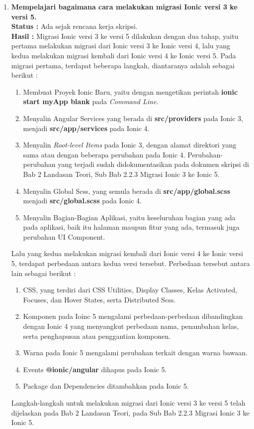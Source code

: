 \documentclass[a4paper,twoside]{article}
\begin{document}
\begin{enumerate}
		\item \textbf{Mempelajari bagaimana cara melakukan migrasi Ionic versi 3 ke versi 5.}\\
		{\bf Status :} Ada sejak rencana kerja skripsi.\\
		{\bf Hasil :} Migrasi Ionic versi 3 ke versi 5 dilakukan dengan dua tahap, yaitu pertama melakukan migrasi dari Ionic versi 3 ke Ionic versi 4, lalu yang kedua melakukan migrasi kembali dari Ionic versi 4 ke Ionic versi 5. Pada migrasi pertama, terdapat beberapa langkah, diantaranya adalah sebagai berikut :
		\begin{enumerate}
			\item Membuat Proyek Ionic Baru, yaitu dengan mengetikan perintah \textbf{ionic start myApp blank} pada \textit{Command Line}.
			\item Menyalin Angular Services yang berada di \textbf{src/providers} pada Ionic 3, menjadi \textbf{src/app/services} pada Ionic 4.
			\item Menyalin \textit{Root-level Items} pada Ionic 3, dengan alamat direktori yang sama atau dengan beberapa perubahan pada Ionic 4. Perubahan-perubahan yang terjadi sudah didokumentasikan pada dokumen skripsi di Bab 2 Landasan Teori, Sub Bab 2.2.3 Migrasi Ionic 3 ke Ionic 5.
			\item Menyalin Global Scss, yang semula berada di \textbf{src/app/global.scss} menjadi \textbf{src/global.scss} pada Ionic 4.
			\item Menyalin Bagian-Bagian Aplikasi, yaitu keseluruhan bagian yang ada pada aplikasi, baik itu halaman maupun fitur yang ada, termasuk juga perubahan UI Component.
		\end{enumerate}
		 
		Lalu yang kedua melakukan migrasi kembali dari Ionic versi 4 ke Ionic versi 5, terdapat perbedaan antara kedua versi tersebut. Perbedaan tersebut antara lain sebagai berikut :
		\begin{enumerate}
			\item CSS, yang terdiri dari CSS Utilities, Display Classes, Kelas Activated, Focuses, dan Hover States, serta Distributed Scss.
			\item Komponen pada Ioinc 5 mengalami perbedaan-perbedaan dibandingkan dengan Ionic 4 yang menyangkut perbedaan nama, penambahan kelas, serta penghapusan atau penggantian komponen.
			\item Warna pada Ionic 5 mengalami perubahan terkait dengan warna bawaan.
			\item Events \textbf{@ionic/angular} dihapus pada Ionic 5.
			\item Package dan Dependencies ditambahkan pada Ionic 5.
		\end{enumerate}				
		Langkah-langkah untuk melakukan migrasi dari Ionic versi 3 ke versi 5 telah dijelaskan pada Bab 2 Landasan Teori, pada Sub Bab 2.2.3 Migrasi Ionic 3 ke Ionic 5.
		

\end{enumerate}
\end{document}
